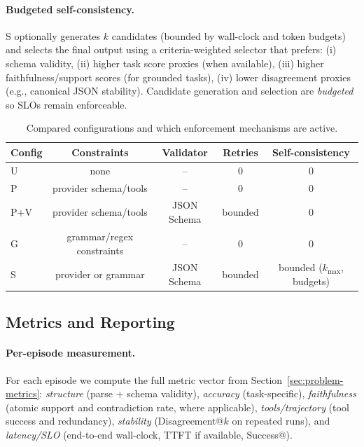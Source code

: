 \paragraph{Budgeted self-consistency.}
S optionally generates $k$ candidates (bounded by wall-clock and token budgets) and selects the final output using a criteria-weighted selector that prefers:
(i) schema validity,
(ii) higher task score proxies (when available),
(iii) higher faithfulness/support scores (for grounded tasks),
(iv) lower disagreement proxies (e.g., canonical JSON stability).
Candidate generation and selection are \emph{budgeted} so SLOs remain enforceable.

\begin{table}[t]
\centering
\small
\begin{tabular}{@{}lcccc@{}}
\toprule
\textbf{Config} & \textbf{Constraints} & \textbf{Validator} & \textbf{Retries} & \textbf{Self-consistency} \\
\midrule
U   & none & -- & 0 & 0 \\
P   & provider schema/tools & -- & 0 & 0 \\
P+V & provider schema/tools & JSON Schema & bounded & 0 \\
G   & grammar/regex constraints & -- & 0 & 0 \\
S   & provider or grammar & JSON Schema & bounded & bounded ($k_{\max}$, budgets) \\
\bottomrule
\end{tabular}
\caption{Compared configurations and which enforcement mechanisms are active.}
\label{tab:config-summary}
\end{table}

\subsection{Metrics and Reporting}
\label{sec:metrics-reporting}

\paragraph{Per-episode measurement.}
For each episode we compute the full metric vector from Section~\ref{sec:problem-metrics}:
\emph{structure} (parse + schema validity),
\emph{accuracy} (task-specific),
\emph{faithfulness} (atomic support and contradiction rate, where applicable),
\emph{tools/trajectory} (tool success and redundancy),
\emph{stability} (Disagreement@$k$ on repeated runs),
and \emph{latency/SLO} (end-to-end wall-clock, TTFT if available, Success@\slo).

